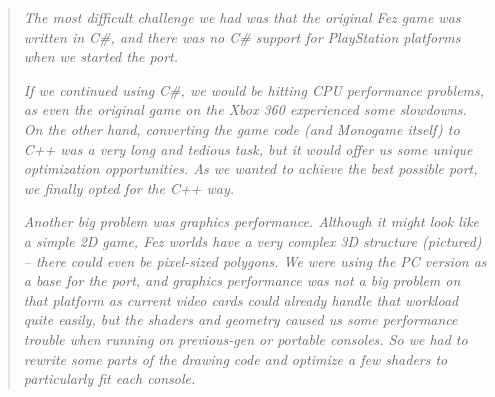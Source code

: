 \begin{quote}
  \textit{
    The most difficult challenge we had was that the original Fez game was written in C\#, and there was no C\# support for PlayStation platforms when we started the port.}

    \textit{If we continued using C\#, we would be hitting CPU performance problems, as even the original game on the Xbox 360 experienced some slowdowns. On the other hand, converting the game code (and Monogame itself) to C++ was a very long and tedious task, but it would offer us some unique optimization opportunities. As we wanted to achieve the best possible port, we finally opted for the C++ way.}

    \textit{Another big problem was graphics performance. Although it might look like a simple 2D game, Fez worlds have a very complex 3D structure (pictured) -- there could even be pixel-sized polygons. We were using the PC version as a base for the port, and graphics performance was not a big problem on that platform as current video cards could already handle that workload quite easily, but the shaders and geometry caused us some performance trouble when running on previous-gen or portable consoles. So we had to rewrite some parts of the drawing code and optimize a few shaders to particularly fit each console.}
    \cite{wawro}
\end{quote}